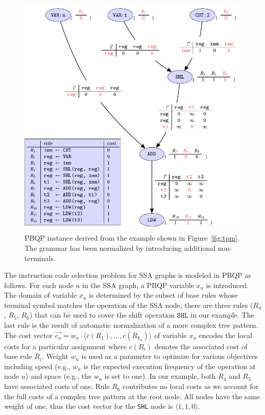 \begin{figure}
  \begin{center}
    \includegraphics[width=\linewidth]{pgf-fig006}
  \end{center}
  \caption{PBQP instance derived from the example shown in
    Figure~\ref{fig:tpm}. The grammar has been normalized by
    introducing additional non-terminals.}\label{fig:pbpq-example}
\end{figure}


The instruction code selection problem for SSA graphs is modeled in PBQP as
follows. For each node $u$ in the SSA graph, a PBQP variable $x_u$ is
introduced. The domain of variable $x_u$ is determined by the subset
of base rules whose terminal symbol matches the operation of the SSA
node, \eg there are three rules ($R_4$, $R_5$, $R_6$) that can be
used to cover the shift operation $\texttt{SHL}$ in our example. The
last rule is the result of automatic normalization of a more complex
tree pattern.
The cost vector $\vec{c_u}= w_u \cdot \langle c(R_1), \dots,
c(R_{k_u}) \rangle$ of variable $x_u$ encodes the local costs for a
particular assignment where $c(R_i)$ denotes the associated cost of
base rule $R_i$. Weight $w_u$ is used as a parameter to optimize for
various objectives including speed (e.g., $w_u$ is the expected
execution frequency of the operation at node $u$) and space (e.g., the
$w_u$ is set to one). In our example, both $R_4$ and $R_5$ have
associated costs of one. Rule $R_6$ contributes no local costs as we
account for the full costs of a complex tree pattern at the root
node. All nodes have the same weight of one, thus the cost vector for
the \texttt{SHL} node is $\langle1, 1, 0 \rangle$.

